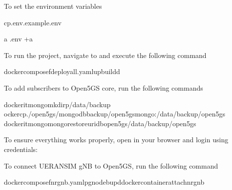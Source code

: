 \documentclass[letterpaper,10pt,english]{sphinxmanual}
\begin{document}
\sphinxAtStartPar
To set the environment variables

\begin{sphinxVerbatim}[commandchars=\\\{\}]
cp.env.example.env

\PYGZhy{}a
.env
+a
\end{sphinxVerbatim}

\sphinxAtStartPar
To run the project, navigate to  and execute the following command

\begin{sphinxVerbatim}[commandchars=\\\{\}]
dockercompose\PYGZhy{}fdeploy\PYGZhy{}all.yamlup\PYGZhy{}\PYGZhy{}build\PYGZhy{}d
\end{sphinxVerbatim}

\sphinxAtStartPar
To add subscribers to Open5GS core, run the following commands

\begin{sphinxVerbatim}[commandchars=\\\{\}]
docker\PYGZhy{}itmongomkdir\PYGZhy{}p/data/backup
ockercp./open5gs/mongodb\PYGZus{}backup/open5gsmongo:/data/backup/open5gs
docker\PYGZhy{}itmongomongorestore\PYGZhy{}\PYGZhy{}uri\PYGZhy{}\PYGZhy{}dbopen5gs/data/backup/open5gs
\end{sphinxVerbatim}

\sphinxAtStartPar
To ensure everything works properly, open  in your browser and login using credentials:

\begin{sphinxVerbatim}[commandchars=\\\{\}]
 
 
\end{sphinxVerbatim}

\sphinxAtStartPar
To connect UERANSIM gNB to Open5GS, run the following command

\begin{sphinxVerbatim}[commandchars=\\\{\}]
dockercompose\PYGZhy{}fnr\PYGZhy{}gnb.yaml\PYGZhy{}pgnodebup\PYGZhy{}ddockercontainerattachnr\PYGZus{}gnb
\end{sphinxVerbatim}
\end{document}
